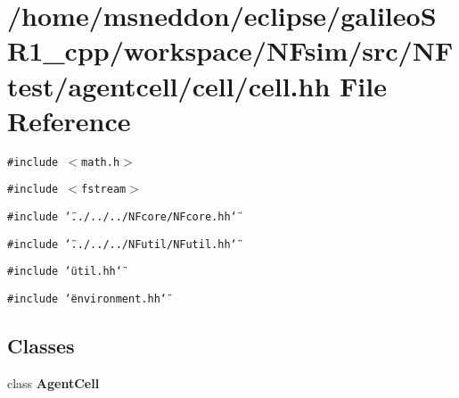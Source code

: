 \section{/home/msneddon/eclipse/galileoSR1\_\-cpp/workspace/NFsim/src/NFtest/agentcell/cell/cell.hh File Reference}
\label{cell_8hh}


{\tt \#include $<$math.h$>$}\par
{\tt \#include $<$fstream$>$}\par
{\tt \#include \char`\"{}../../../NFcore/NFcore.hh\char`\"{}}\par
{\tt \#include \char`\"{}../../../NFutil/NFutil.hh\char`\"{}}\par
{\tt \#include \char`\"{}util.hh\char`\"{}}\par
{\tt \#include \char`\"{}environment.hh\char`\"{}}\par
\subsection*{Classes}
\begin{CompactItemize}
\item 
class {\bf AgentCell}
\end{CompactItemize}
